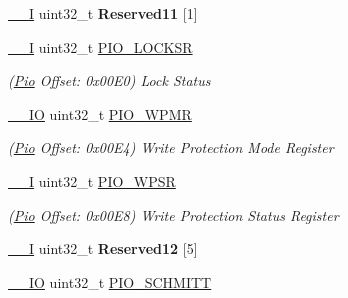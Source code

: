 \begin{DoxyCompactItemize}
\mbox{\label{structPio_abd22f90f56bb465594f555c90b455f5c}} 
\mbox{\hyperlink{core__cm7_8h_af63697ed9952cc71e1225efe205f6cd3}{\+\_\+\+\_\+I}} uint32\+\_\+t {\bfseries Reserved11} \mbox{[}1\mbox{]}
\item 
\mbox{\label{structPio_a51873681838f0fbd4818b4d5a78fd929}} 
\mbox{\hyperlink{core__cm7_8h_af63697ed9952cc71e1225efe205f6cd3}{\+\_\+\+\_\+I}} uint32\+\_\+t \mbox{\hyperlink{structPio_a51873681838f0fbd4818b4d5a78fd929}{P\+I\+O\+\_\+\+L\+O\+C\+K\+SR}}
\begin{DoxyCompactList}\small\item\em (\mbox{\hyperlink{structPio}{Pio}} Offset\+: 0x00\+E0) Lock Status \end{DoxyCompactList}\item 
\mbox{\label{structPio_a256a5f2b3f3e11c444db993ffd26ee44}} 
\mbox{\hyperlink{core__cm7_8h_aec43007d9998a0a0e01faede4133d6be}{\+\_\+\+\_\+\+IO}} uint32\+\_\+t \mbox{\hyperlink{structPio_a256a5f2b3f3e11c444db993ffd26ee44}{P\+I\+O\+\_\+\+W\+P\+MR}}
\begin{DoxyCompactList}\small\item\em (\mbox{\hyperlink{structPio}{Pio}} Offset\+: 0x00\+E4) Write Protection Mode Register \end{DoxyCompactList}\item 
\mbox{\label{structPio_a7c98decf3283f5f0323f00e1937af185}} 
\mbox{\hyperlink{core__cm7_8h_af63697ed9952cc71e1225efe205f6cd3}{\+\_\+\+\_\+I}} uint32\+\_\+t \mbox{\hyperlink{structPio_a7c98decf3283f5f0323f00e1937af185}{P\+I\+O\+\_\+\+W\+P\+SR}}
\begin{DoxyCompactList}\small\item\em (\mbox{\hyperlink{structPio}{Pio}} Offset\+: 0x00\+E8) Write Protection Status Register \end{DoxyCompactList}\item 
\mbox{\label{structPio_a1c62f0a64f528226541923c9d06536c6}} 
\mbox{\hyperlink{core__cm7_8h_af63697ed9952cc71e1225efe205f6cd3}{\+\_\+\+\_\+I}} uint32\+\_\+t {\bfseries Reserved12} \mbox{[}5\mbox{]}
\item 
\mbox{\label{structPio_acf13051c2649dc9fee893b4c9e5e78f5}} 
\mbox{\hyperlink{core__cm7_8h_aec43007d9998a0a0e01faede4133d6be}{\+\_\+\+\_\+\+IO}} uint32\+\_\+t \mbox{\hyperlink{structPio_acf13051c2649dc9fee893b4c9e5e78f5}{P\+I\+O\+\_\+\+S\+C\+H\+M\+I\+TT}}

\end{DoxyCompactItemize}
